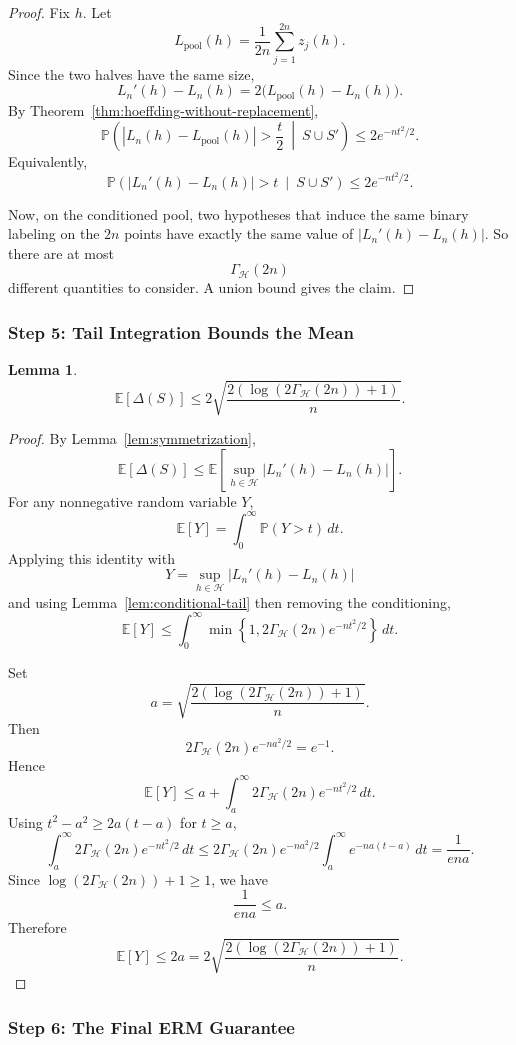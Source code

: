 \documentclass{article}
\newtheorem{lemma}[theorem]{Lemma}
\theoremstyle{definition}
\theoremstyle{remark}
\newcommand{\EE}{\mathbb{E}}
\newcommand{\PP}{\mathbb{P}}
\newcommand{\cH}{\mathcal{H}}
\begin{document}
\begin{proof}
Fix $h$. Let
$$
L_{\mathrm{pool}}(h) = \frac{1}{2n}\sum_{j=1}^{2n} z_j(h).
$$
Since the two halves have the same size,
$$
L_n'(h)-L_n(h)
=
2\bigl(L_{\mathrm{pool}}(h)-L_n(h)\bigr).
$$
By Theorem~\ref{thm:hoeffding-without-replacement},
$$
\PP\!\left(
|L_n(h)-L_{\mathrm{pool}}(h)| > \frac{t}{2}
\ \middle|\
S \cup S'
\right)
\le
2e^{-nt^2/2}.
$$
Equivalently,
$$
\PP\!\left(
|L_n'(h)-L_n(h)| > t
\ \middle|\
S \cup S'
\right)
\le
2e^{-nt^2/2}.
$$

Now, on the conditioned pool, two hypotheses that induce the same binary labeling on the $2n$ points have exactly the same value of $|L_n'(h)-L_n(h)|$. So there are at most
$$
\Gamma_{\cH}(2n)
$$
different quantities to consider. A union bound gives the claim.
\end{proof}

\subsubsection{Step 5: Tail Integration Bounds the Mean}

\begin{lemma}
\label{lem:expected-delta-bound}
$$
\EE[\Delta(S)]
\le
2\sqrt{
\frac{2(\log(2\Gamma_{\cH}(2n))+1)}{n}
}.
$$
\end{lemma}

\begin{proof}
By Lemma~\ref{lem:symmetrization},
$$
\EE[\Delta(S)]
\le
\EE\!\left[
\sup_{h\in\cH} |L_n'(h)-L_n(h)|
\right].
$$
For any nonnegative random variable $Y$,
$$
\EE[Y] = \int_0^\infty \PP(Y>t)\,dt.
$$
Applying this identity with
$$
Y = \sup_{h\in\cH} |L_n'(h)-L_n(h)|
$$
and using Lemma~\ref{lem:conditional-tail} then removing the conditioning,
$$
\EE[Y]
\le
\int_0^\infty \min\!\left\{1, 2\Gamma_{\cH}(2n)e^{-nt^2/2}\right\}\,dt.
$$

Set
$$
a = \sqrt{\frac{2(\log(2\Gamma_{\cH}(2n))+1)}{n}}.
$$
Then
$$
2\Gamma_{\cH}(2n)e^{-na^2/2} = e^{-1}.
$$
Hence
$$
\EE[Y]
\le
a + \int_a^\infty 2\Gamma_{\cH}(2n)e^{-nt^2/2}\,dt.
$$
Using $t^2-a^2 \ge 2a(t-a)$ for $t\ge a$,
$$
\int_a^\infty 2\Gamma_{\cH}(2n)e^{-nt^2/2}\,dt
\le
2\Gamma_{\cH}(2n)e^{-na^2/2}\int_a^\infty e^{-na(t-a)}\,dt
=
\frac{1}{ena}.
$$
Since $\log(2\Gamma_{\cH}(2n))+1 \ge 1$, we have
$$
\frac{1}{ena} \le a.
$$
Therefore
$$
\EE[Y] \le 2a
=
2\sqrt{
\frac{2(\log(2\Gamma_{\cH}(2n))+1)}{n}
}.
$$
\end{proof}

\subsubsection{Step 6: The Final ERM Guarantee}
\end{document}
